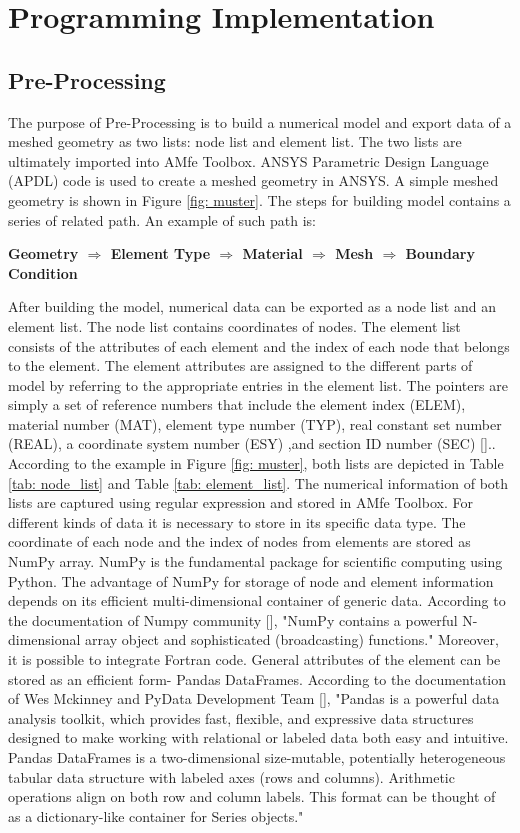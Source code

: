 \chapter{Programming Implementation}
\section{Pre-Processing}
The purpose of Pre-Processing is to build a numerical model and export data of a meshed geometry as two lists: node list and element list.  The two lists are ultimately imported into AMfe Toolbox. ANSYS Parametric Design Language (APDL) code is used to create a meshed geometry in ANSYS. A simple meshed geometry is shown in Figure \ref{fig: muster}. The steps for building model contains a series of related path. An example of such path is: 

\begin{center}
	\large{\textbf{Geometry $\Rightarrow$ Element Type $\Rightarrow$ Material $\Rightarrow$ Mesh
			$\Rightarrow$ Boundary Condition  }}
\end{center}

After building the model, numerical data can be exported as a node list and an element list. The node list contains coordinates of nodes. The element list consists of the attributes of each element and the index of each node that belongs to the element. The element attributes are assigned to the different parts of model by referring to the appropriate entries in the element list. The pointers are simply a set of reference numbers that include  the element index (ELEM), material number (MAT), element type number (TYP), real constant set number (REAL), a coordinate system number (ESY) ,and section ID number (SEC) [\cite{ANSYS}].. According to the example in Figure \ref{fig: muster}, both lists are depicted in Table \ref{tab: node_list} and Table \ref{tab: element_list}. The numerical information of both lists are captured using regular expression and stored in AMfe Toolbox. For different kinds of data it is necessary to store in its specific data type. The coordinate of each node and the index of nodes from elements are stored as NumPy array. NumPy is the fundamental package for scientific computing using Python. The advantage of NumPy for storage of node and element information depends on its efficient multi-dimensional container of generic data. According to the documentation of Numpy community [\cite{Numpy}], "NumPy contains a powerful N-dimensional array object and sophisticated (broadcasting) functions." Moreover, it is possible to integrate Fortran code. General attributes of the element can be stored as an efficient form- Pandas DataFrames. According to the documentation of Wes Mckinney and PyData Development Team [\cite{Pandas}], "Pandas is a powerful data analysis toolkit, which provides fast, flexible, and expressive data structures designed to make working with relational or labeled data both easy and intuitive. Pandas DataFrames is a two-dimensional size-mutable, potentially heterogeneous tabular data structure with labeled axes (rows and columns). Arithmetic operations align on both row and column labels. This format can be thought of as a dictionary-like container for Series objects." 

